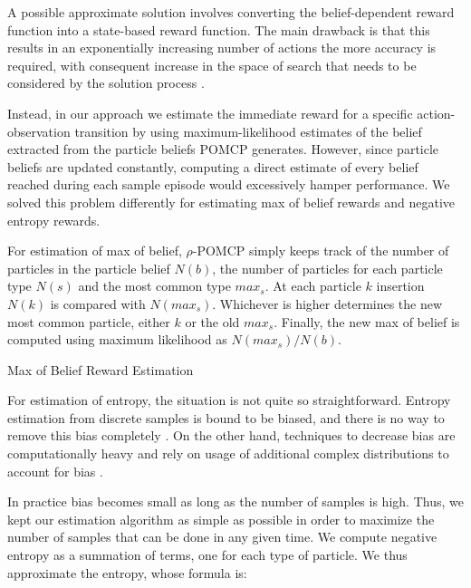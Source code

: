 A possible approximate solution involves converting the belief-dependent reward function into a
state-based reward function. The main drawback is that this results in an exponentially increasing
number of actions the more accuracy is required, with consequent increase in the space of search
that needs to be considered by the solution process \cite{rpomdp}.

Instead, in our approach we estimate the immediate reward for a specific action-observation
transition by using maximum-likelihood estimates of the belief extracted from the particle beliefs
POMCP generates. However, since particle beliefs are updated constantly, computing a direct estimate
of every belief reached during each sample episode would excessively hamper performance. We solved
this problem differently for estimating max of belief rewards and negative entropy rewards.

For estimation of max of belief, $\rho$-POMCP simply keeps track of the number of particles in the
particle belief $N(b)$, the number of particles for each particle type $N(s)$ and the most common
type $max_s$. At each particle $k$ insertion $N(k)$ is compared with $N(max_s)$. Whichever is higher
determines the new most common particle, either $k$ or the old $max_s$. Finally, the new max of
belief is computed using maximum likelihood as $N(max_s)/N(b)$.

\begin{algorithm}[H]
    \caption{Max of Belief Reward Estimation}

\end{algorithm}

For estimation of entropy, the situation is not quite so straightforward. Entropy estimation from
discrete samples is bound to be biased, and there is no way to remove this bias completely
\cite{cit:badentropy}. On the other hand, techniques to decrease bias are computationally heavy and
rely on usage of additional complex distributions to account for bias \cite{cit:entropyfixes}.

In practice bias becomes small as long as the number of samples is high. Thus, we kept our
estimation algorithm as simple as possible in order to maximize the number of samples that can be
done in any given time. We compute negative entropy as a summation of terms, one for each type of
particle. We thus approximate the entropy, whose formula is:

